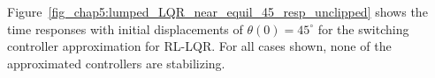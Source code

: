 %
Figure~\ref{fig_chap5:lumped_LQR_near_equil_45_resp_unclipped} shows the time responses with initial displacements of $\theta(0)=45^\circ$ for the switching controller approximation for RL-LQR. For all cases shown, none of the approximated controllers are stabilizing.
%
